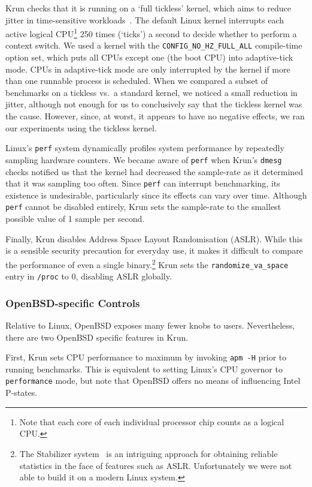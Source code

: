 \documentclass[preprint,numbers,10pt]{sigplanconf}
\newcommand{\krun}{Krun\xspace}
\begin{document}
\krun checks that it is running on a `full tickless' kernel, which aims to reduce
jitter in time-sensitive workloads~\cite{tickless}. The default
Linux kernel interrupts each active logical CPU\footnote{Note that each core of
each individual processor chip counts as a logical CPU.} 250 times (`ticks') a second to
decide whether to perform a context switch. We used a kernel with the
\texttt{CONFIG\_NO\_HZ\_FULL\_ALL} compile-time option set, which puts
all CPUs except one (the boot CPU) into adaptive-tick mode.
CPUs in adaptive-tick mode are only interrupted by the kernel if more than
one runnable process is scheduled.
When we compared a subset of benchmarks on a tickless vs.~a standard
kernel, we noticed a small reduction in jitter, although not enough for us to
conclusively say that the tickless kernel was the cause. However,
since, at worst, it appears to have no negative effects, we ran our experiments
using the tickless kernel.

Linux's \texttt{perf} system dynamically profiles system performance by
repeatedly sampling hardware counters. We became aware of \texttt{perf} when
\krun's \texttt{dmesg} checks notified us that the kernel had decreased the
sample-rate as it determined that it was sampling too often. Since \texttt{perf}
can interrupt benchmarking, its existence is undesirable, particularly since its
effects can vary over time. Although \texttt{perf} cannot be disabled entirely,
\krun sets the sample-rate to the smallest possible value of 1 sample per
second.

Finally, \krun disables Address Space Layout Randomisation (ASLR). While this is
a sensible security precaution for everyday use, it makes it difficult to
compare the performance of even a single binary.\footnote{The Stabilizer
system~\cite{curtsinger13stabilizer} is an intriguing approach for obtaining reliable
statistics in the face of features such as ASLR. Unfortunately we were not able
to build it on a modern Linux system.} \krun sets the
\texttt{randomize\_va\_space} entry in \texttt{/proc} to 0, disabling ASLR
globally.


\subsubsection{OpenBSD-specific Controls}

Relative to Linux, OpenBSD exposes many fewer knobs to users. Nevertheless,
there are two OpenBSD specific features in \krun.

First, \krun sets CPU performance to maximum by invoking \texttt{apm -H} prior
to running benchmarks. This is equivalent to setting Linux's CPU governor to
\texttt{performance} mode, but note that OpenBSD offers no means of influencing
Intel P-states.
\end{document}
